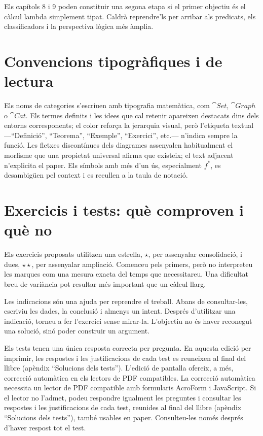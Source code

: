 Els capítols 8 i 9 poden constituir una segona etapa
si el primer objectiu és el càlcul lambda simplement tipat.
Caldrà reprendre'ls per arribar als predicats, els
classificadors i la perspectiva lògica més àmplia.

\section{Convencions tipogràfiques i de lectura}

Els noms de categories s'escriuen amb tipografia matemàtica, com $\cat{Set}$, $\cat{Graph}$ o $\cat{Cat}$. Els termes definits i les idees que cal retenir apareixen destacats dins dels entorns corresponents; el color reforça la jerarquia visual, però l'etiqueta textual ---\enquote{Definició}, \enquote{Teorema}, \enquote{Exemple}, \enquote{Exercici}, etc.--- n'indica sempre la funció. Les fletxes discontínues dels diagrames assenyalen habitualment el morfisme que una propietat universal afirma que existeix; el text adjacent n'explicita el paper. Els símbols amb més d'un ús, especialment $f^{*}$, es desambigüen pel context i es recullen a la taula de notació.

\section{Exercicis i tests: què comproven i què no}

Els exercicis proposats utilitzen una estrella,
$\star$, per assenyalar consolidació, i dues,
$\star\star$, per assenyalar ampliació. Comenceu pels
primers, però no interpreteu les marques com una mesura
exacta del temps que necessitareu. Una dificultat breu
de variància pot resultar més important que un càlcul llarg.

Les indicacions són una ajuda per reprendre el treball.
Abans de consultar-les, escriviu les dades, la conclusió
i almenys un intent. Després d'utilitzar una indicació,
torneu a fer l'exercici sense mirar-la. L'objectiu no és
haver reconegut una solució, sinó poder construir un argument.

Els tests tenen una única resposta correcta per pregunta.
\ifimprimible
En aquesta edició per imprimir, les respostes i les
justificacions de cada test es reuneixen al final del llibre
(apèndix \enquote{Solucions dels tests}). L'edició de pantalla
ofereix, a més, correcció automàtica en els lectors de PDF
compatibles.
\else
La correcció automàtica necessita un lector de PDF compatible
amb formularis AcroForm i JavaScript. Si el lector no
l'admet, podeu respondre igualment les preguntes i
consultar les respostes i les justificacions de cada test,
reunides al final del llibre (apèndix \enquote{Solucions dels
tests}), també usables en paper.
\fi
Consulteu-les només després d'haver respost tot el test.

